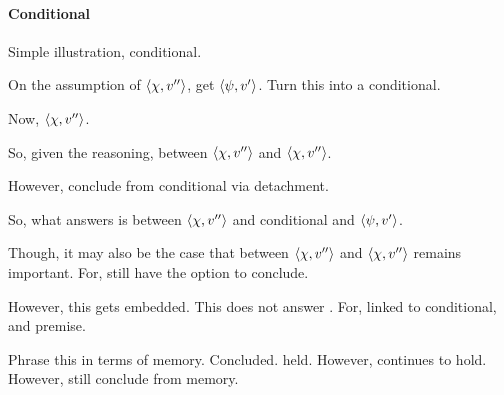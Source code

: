 \paragraph{Conditional}

\begin{note}
  Simple illustration, conditional.

  On the assumption of \(\langle \chi, v'' \rangle\), get \(\langle \psi, v' \rangle\).
  Turn this into a conditional.

  Now, \(\langle \chi, v'' \rangle\).

  So, given the reasoning, \support{} between \(\langle \chi, v'' \rangle\) and \(\langle \chi, v'' \rangle\).

  However, conclude from conditional via detachment.

  So, what answers \qWhyV{} is \support{} between \(\langle \chi, v'' \rangle\) and conditional and \(\langle \psi, v' \rangle\).

  Though, it may also be the case that \support{} between \(\langle \chi, v'' \rangle\) and \(\langle \chi, v'' \rangle\) remains important.
  For, still have the option to conclude.

  However, this gets embedded.
  This \support{} does not answer \qWhyV{}.
  For, linked to conditional, and premise.
\end{note}

\begin{note}
  Phrase this in terms of memory.
  Concluded.
   held.
  However, \support{} continues to hold.
  However, still conclude from memory.
\end{note}

\subparagraph{\citeauthor{Owens:2006tw}}

